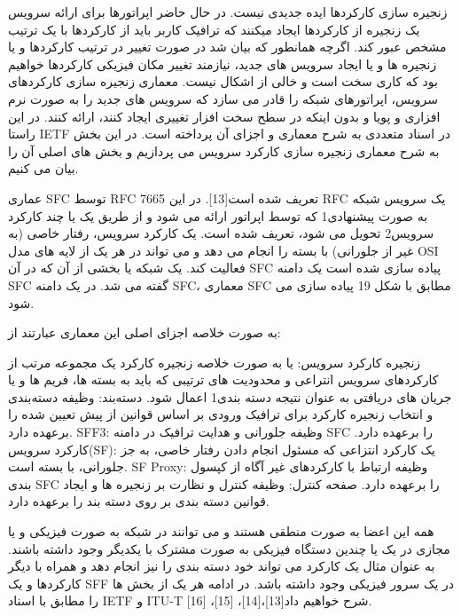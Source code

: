 
زنجیره سازی کارکردها ایده جدیدی نیست. در حال حاضر اپراتورها برای ارائه سرویس یک زنجیره از کارکردها ایجاد میکنند که ترافیک کاربر باید از کارکردها با یک ترتیب مشخص عبور کند. اگرچه همانطور که بیان شد در صورت تغییر در ترتیب کارکردها و یا زنجیره ها و یا ایجاد سرویس های جدید، نیازمند تغییر مکان فیزیکی کارکردها خواهیم بود که کاری سخت است و خالی از اشکال نیست. معماری زنجیره سازی کارکردهای سرویس، اپراتورهای شبکه را قادر می سازد که سرویس های جدید را به صورت نرم افزاری و پویا و بدون اینکه در سطح سخت افزار تغییری ایجاد کنند، ارائه کنند. در این راستا IETF در اسناد متعددی به شرح معماری و اجزای آن پرداخته است. در این بخش به شرح معماری زنجیره سازی کارکرد سرویس می پردازیم و بخش های اصلی آن را بیان می کنیم.


عماری SFC توسط RFC 7665 تعریف شده است[13]. در این RFC یک سرویس شبکه به صورت پیشنهادی1 که توسط اپراتور ارائه می شود و از طریق یک یا چند کارکرد سرویس2 تحویل می شود، تعریف شده است. یک کارکرد سرویس، رفتار خاصی (به غیر از جلورانی) با بسته را انجام می دهد و می تواند در هر یک از لایه های مدل OSI فعالیت کند. یک شبکه یا بخشی از آن که در آن SFC  پیاده سازی شده است یک دامنه SFC گفته می شد. در یک دامنه SFC، معماری SFC مطابق با شکل 19 پیاده سازی می شود.

به صورت خلاصه اجزای اصلی این معماری عبارتند از:

 زنجیره کارکرد سرویس: یا به صورت خلاصه زنجیره کارکرد یک مجموعه مرتب از کارکردهای سرویس انتراعی و محدودیت های ترتیبی که باید به بسته ها، فریم ها و یا جریان های دریافتی به عنوان نتیجه دسته بندی1 اعمال شود.
 دسته‌بند: وظیفه دسته‌بندی و انتخاب زنجیره کارکرد برای ترافیک ورودی بر اساس قوانین از پیش تعیین شده را برعهده دارد.
 SFF3: وظیفه جلورانی و هدایت ترافیک در دامنه SFC را برعهده دارد.
 کارکرد سرویس(SF): یک کارکرد انتزاعی که مسئول انجام دادن رفتار خاصی، به جز جلورانی، با بسته است.
 SF Proxy: وظیفه ارتباط با کارکردهای غیر آگاه از کپسول بندی SFC را برعهده دارد.
 صفحه کنترل: وظیفه کنترل و نظارت بر زنجیره ها و ایجاد قوانین دسته بندی بر روی دسته بند را برعهده دارد.

همه این اعضا به صورت منطقی هستند و می توانند در شبکه به صورت فیزیکی و یا مجازی در یک یا چندین دستگاه فیزیکی به صورت مشترک با یکدیگر وجود داشته باشند. به عنوان مثال یک کارکرد می تواند خود دسته بندی را نیز انجام دهد و همراه با دیگر کارکردها و یک SFF در یک سرور فیزیکی وجود داشته باشد. در ادامه هر یک از بخش ها را مطابق با اسناد IETF و ITU-T شرح خواهیم داد[13]،[14]، [15]، [16].

